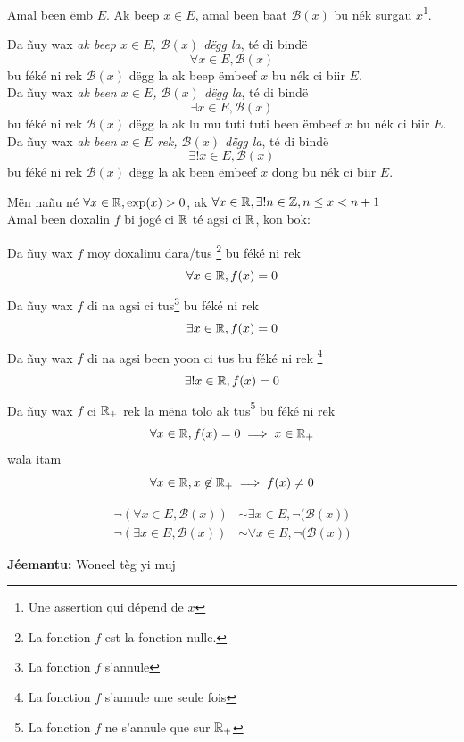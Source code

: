 \documentclass[twoside, a4paper]{article}
\begin{document}
\begin{tcolorbox}[enhanced jigsaw,breakable,pad at break*=1mm, colback=red!5!white,colframe=white!75!black,title= Téeki,
  watermark color=white]
Amal been ëmb $E$. Ak beep $x\in E$, amal been baat $\mathcal{B}(x)$ bu nék surgau $x$\footnote{Une assertion qui dépend de $x$}.

Da ñuy wax \textit{ak beep $x\in E$, $\mathcal{B}(x)$ dëgg la}, té di bindë $$\forall x\in E, \mathcal{B}(x)$$ bu féké ni rek $\mathcal{B}(x)$ dëgg la ak beep ëmbeef $x$ bu nék ci biir $E$.\\

Da ñuy wax \textit{ak been $x\in E$, $\mathcal{B}(x)$ dëgg la}, té di bindë $$\exists x\in E, \mathcal{B}(x)$$ bu féké ni rek $\mathcal{B}(x)$ dëgg la ak lu mu tuti tuti been ëmbeef $x$ bu nék ci biir $E$.\\

Da ñuy wax \textit{ak been $x\in E$ rek, $\mathcal{B}(x)$ dëgg la}, té di bindë $$\exists! x\in E, \mathcal{B}(x)$$ bu féké ni rek $\mathcal{B}(x)$ dëgg la ak been ëmbeef $x$ dong bu nék ci biir $E$.
\end{tcolorbox}

Mën nañu né $\forall x \in \mathbb{R}, \exp(x) > 0$, ak $\forall x \in \mathbb{R}, \exists ! n \in \mathbb{Z}, n\leq x < n+1$\\

Amal been doxalin $f$ bi jogé ci $\mathbb{R}$ té agsi ci $\mathbb{R}$, kon bok:

Da ñuy wax $f$ moy doxalinu dara/tus \footnote{La fonction $f$ est la fonction nulle.} bu féké ni rek  $$\forall x \in \mathbb{R}, f(x) = 0$$
Da ñuy wax $f$ di na agsi ci tus\footnote{La fonction $f$ s'annule} bu féké ni rek $$\exists x \in \mathbb{R}, f(x) = 0$$
Da ñuy wax $f$ di na agsi been yoon ci tus bu féké ni rek \footnote{La fonction $f$ s'annule une seule fois} $$\exists! x \in \mathbb{R}, f(x) = 0$$
Da ñuy wax $f$ ci $\mathbb{R}_{+}$ rek la mëna tolo ak tus\footnote{La fonction $f$ ne s'annule que sur $\mathbb{R}_{+}$} bu féké ni rek $$\forall x \in \mathbb{R}, f(x) = 0 \implies x \in \mathbb{R}_{+}$$
wala itam $$\forall x \in \mathbb{R}, x \not\in \mathbb{R}_{+} \implies f(x) \neq 0$$


\begin{tcolorbox}[enhanced jigsaw,breakable,pad at break*=1mm, colback=blue!5!white,colframe=white!75!black,title= Tèg\footnote{Proposition},
  watermark color=white]
\begin{align*}
    \neg(\forall x\in E, \mathcal{B}(x)) &\sim \exists x\in E, \neg \big(\mathcal{B}(x)\big) \\
    \neg(\exists x\in E, \mathcal{B}(x)) &\sim \forall x\in E, \neg \big(\mathcal{B}(x)\big)
\end{align*} 
\end{tcolorbox}
\textbf{Jéemantu:} Woneel tèg yi muj
\end{document}
